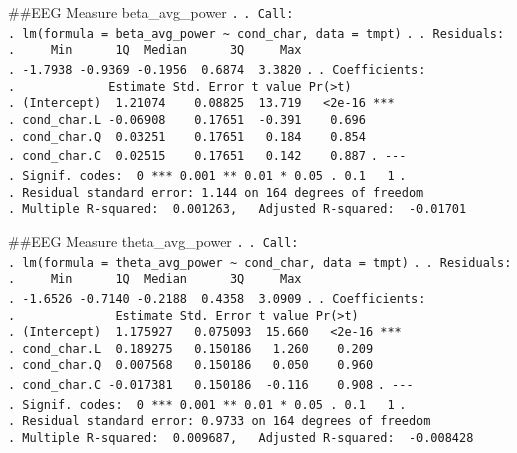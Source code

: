 \documentclass[
]{article}
\begin{document}
\#\#EEG Measure beta\_avg\_power \texttt{.} \texttt{.\ Call:}
\texttt{.\ lm(formula\ =\ beta\_avg\_power\ \textasciitilde{}\ cond\_char,\ data\ =\ tmpt)}
\texttt{.} \texttt{.\ Residuals:}
\texttt{.\ \ \ \ \ Min\ \ \ \ \ \ 1Q\ \ Median\ \ \ \ \ \ 3Q\ \ \ \ \ Max}
\texttt{.\ -1.7938\ -0.9369\ -0.1956\ \ 0.6874\ \ 3.3820} \texttt{.}
\texttt{.\ Coefficients:}
\texttt{.\ \ \ \ \ \ \ \ \ \ \ \ \ Estimate\ Std.\ Error\ t\ value\ Pr(\textgreater{}\textbar{}t\textbar{})}
\texttt{.\ (Intercept)\ \ 1.21074\ \ \ \ 0.08825\ \ 13.719\ \ \ \textless{}2e-16\ ***}
\texttt{.\ cond\_char.L\ -0.06908\ \ \ \ 0.17651\ \ -0.391\ \ \ \ 0.696}
\texttt{.\ cond\_char.Q\ \ 0.03251\ \ \ \ 0.17651\ \ \ 0.184\ \ \ \ 0.854}
\texttt{.\ cond\_char.C\ \ 0.02515\ \ \ \ 0.17651\ \ \ 0.142\ \ \ \ 0.887}
\texttt{.\ -\/-\/-}
\texttt{.\ Signif.\ codes:\ \ 0\ \textquotesingle{}***\textquotesingle{}\ 0.001\ \textquotesingle{}**\textquotesingle{}\ 0.01\ \textquotesingle{}*\textquotesingle{}\ 0.05\ \textquotesingle{}.\textquotesingle{}\ 0.1\ \textquotesingle{}\ \textquotesingle{}\ 1}
\texttt{.}
\texttt{.\ Residual\ standard\ error:\ 1.144\ on\ 164\ degrees\ of\ freedom}
\texttt{.\ Multiple\ R-squared:\ \ 0.001263,\ \ \ Adjusted\ R-squared:\ \ -0.01701}

\#\#EEG Measure theta\_avg\_power \texttt{.} \texttt{.\ Call:}
\texttt{.\ lm(formula\ =\ theta\_avg\_power\ \textasciitilde{}\ cond\_char,\ data\ =\ tmpt)}
\texttt{.} \texttt{.\ Residuals:}
\texttt{.\ \ \ \ \ Min\ \ \ \ \ \ 1Q\ \ Median\ \ \ \ \ \ 3Q\ \ \ \ \ Max}
\texttt{.\ -1.6526\ -0.7140\ -0.2188\ \ 0.4358\ \ 3.0909} \texttt{.}
\texttt{.\ Coefficients:}
\texttt{.\ \ \ \ \ \ \ \ \ \ \ \ \ \ Estimate\ Std.\ Error\ t\ value\ Pr(\textgreater{}\textbar{}t\textbar{})}
\texttt{.\ (Intercept)\ \ 1.175927\ \ \ 0.075093\ \ 15.660\ \ \ \textless{}2e-16\ ***}
\texttt{.\ cond\_char.L\ \ 0.189275\ \ \ 0.150186\ \ \ 1.260\ \ \ \ 0.209}
\texttt{.\ cond\_char.Q\ \ 0.007568\ \ \ 0.150186\ \ \ 0.050\ \ \ \ 0.960}
\texttt{.\ cond\_char.C\ -0.017381\ \ \ 0.150186\ \ -0.116\ \ \ \ 0.908}
\texttt{.\ -\/-\/-}
\texttt{.\ Signif.\ codes:\ \ 0\ \textquotesingle{}***\textquotesingle{}\ 0.001\ \textquotesingle{}**\textquotesingle{}\ 0.01\ \textquotesingle{}*\textquotesingle{}\ 0.05\ \textquotesingle{}.\textquotesingle{}\ 0.1\ \textquotesingle{}\ \textquotesingle{}\ 1}
\texttt{.}
\texttt{.\ Residual\ standard\ error:\ 0.9733\ on\ 164\ degrees\ of\ freedom}
\texttt{.\ Multiple\ R-squared:\ \ 0.009687,\ \ \ Adjusted\ R-squared:\ \ -0.008428}
\end{document}
